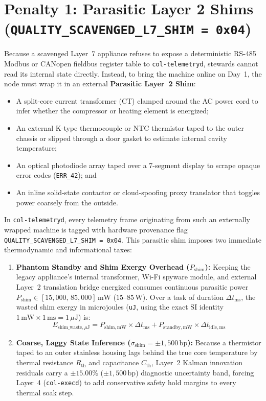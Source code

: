 \section{Penalty 1: Parasitic Layer 2 Shims (\texttt{QUALITY\_SCAVENGED\_L7\_SHIM = 0x04})}
\label{sec:l7-penalty-shims}

Because a scavenged Layer~7 appliance refuses to expose a deterministic RS-485 Modbus or CANopen fieldbus register table to \texttt{col-telemetryd}, stewards cannot read its internal state directly. Instead, to bring the machine online on Day~1, the node must wrap it in an external \textbf{Parasitic Layer~2 Shim}:
\begin{itemize}
    \item A split-core current transformer (CT) clamped around the AC power cord to infer whether the compressor or heating element is energized;
    \item An external K-type thermocouple or NTC thermistor taped to the outer chassis or slipped through a door gasket to estimate internal cavity temperature;
    \item An optical photodiode array taped over a 7-segment display to scrape opaque error codes (\texttt{ERR\_42}); and
    \item An inline solid-state contactor or cloud-spoofing proxy translator that toggles power coarsely from the outside.
\end{itemize}

In \texttt{col-telemetryd}, every telemetry frame originating from such an externally wrapped machine is tagged with hardware provenance flag \texttt{QUALITY\_SCAVENGED\_L7\_SHIM = 0x04}. This parasitic shim imposes two immediate thermodynamic and informational taxes:
\begin{enumerate}
    \item \textbf{Phantom Standby and Shim Exergy Overhead ($P_{\mathrm{shim}}$):} Keeping the legacy appliance's internal transformer, Wi-Fi spyware module, and external Layer~2 translation bridge energized consumes continuous parasitic power $P_{\mathrm{shim}} \in [15{,}000,\, 85{,}000]\,\mathrm{mW}$ ($15\text{--}85\,\mathrm{W}$). Over a task of duration $\Delta t_{\mathrm{ms}}$, the wasted shim exergy in microjoules (\texttt{uJ}, using the exact SI identity $1\,\mathrm{mW} \times 1\,\mathrm{ms} = 1\,\mu\mathrm{J}$) is:
    \begin{equation}
    E_{\mathrm{shim\_waste},\mu\mathrm{J}} = P_{\mathrm{shim},\mathrm{mW}} \times \Delta t_{\mathrm{ms}} + P_{\mathrm{standby},\mathrm{mW}} \times \Delta t_{\mathrm{idle,ms}}
    \label{eq:ch2-shim-waste}
    \end{equation}
    \item \textbf{Coarse, Laggy State Inference ($\sigma_{\mathrm{shim}} = \pm 1{,}500\,\mathrm{bp}$):} Because a thermistor taped to an outer stainless housing lags behind the true core temperature by thermal resistance $R_{\mathrm{th}}$ and capacitance $C_{\mathrm{th}}$, Layer~2 Kalman innovation residuals carry a $\pm 15.00\%$ ($\pm 1{,}500\,\mathrm{bp}$) diagnostic uncertainty band, forcing Layer~4 (\texttt{col-execd}) to add conservative safety hold margins to every thermal soak step.
\end{enumerate}

